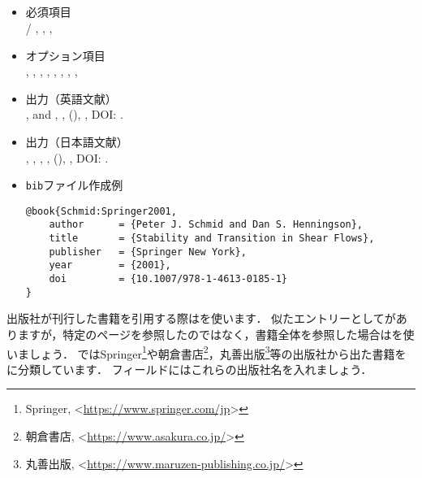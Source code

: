 \documentclass[a4paper,fleqn,uplatex,dvipdfmx]{jsarticle}
\begin{document}
\subsection{\ttbook}
\label{ssec:book}
\begin{tcolorbox}[enhanced, title=\ttbook, drop fuzzy shadow]
    \begin{itemize}
        \item 必須項目 \\
        \ttauthor / \tteditor, \tttitle, \ttpublisher, \ttyear
        \item オプション項目 \\
        \ttvolume, \ttnumber, \ttseries, \ttaddress, \ttedition, \ttmonth, \ttnote, \ttkey, \ttdoi
        \item 出力（英語文献） \\
            \colorbox[gray]{0.8}{\ttauthorf}, \colorbox[gray]{0.8}{\ttauthors} and \colorbox[gray]{0.8}{\ttauthort}, \colorbox[gray]{0.8}{\tttitle}, \colorbox[gray]{0.8}{\ttpublisher} (\colorbox[gray]{0.8}{\ttyear}), \colorbox[gray]{0.8}{\ttnote}, DOI: \colorbox[gray]{0.8}{\ttdoi}.
        \item 出力（日本語文献） \\
            \colorbox[gray]{0.8}{\ttauthorf}, \colorbox[gray]{0.8}{\ttauthors}, \colorbox[gray]{0.8}{\ttauthort}, \colorbox[gray]{0.8}{\tttitle}, \colorbox[gray]{0.8}{\ttpublisher} (\colorbox[gray]{0.8}{\ttyear}), \colorbox[gray]{0.8}{\ttnote}, DOI: \colorbox[gray]{0.8}{\ttdoi}.
        \item \verb|bib|ファイル作成例 \vspace{-3mm}
\begin{verbatim}
@book{Schmid:Springer2001,
    author      = {Peter J. Schmid and Dan S. Henningson},
    title       = {Stability and Transition in Shear Flows},
    publisher   = {Springer New York},
    year        = {2001},
    doi         = {10.1007/978-1-4613-0185-1}
}
\end{verbatim}
    \end{itemize}
\end{tcolorbox}

出版社が刊行した書籍を引用する際は\ttbook を使います．
似たエントリーとして\ttinbook がありますが，特定のページを参照したのではなく，書籍全体を参照した場合は\ttbook を使いましょう．
\JSMErepos ではSpringer\footnote{Springer, \textless\url{https://www.springer.com/jp}\textgreater}や朝倉書店\footnote{朝倉書店, \textless\url{https://www.asakura.co.jp/}\textgreater}，丸善出版\footnote{丸善出版, \textless\url{https://www.maruzen-publishing.co.jp/}\textgreater}等の出版社から出た書籍を\ttbook に分類しています．
\ttpublisher フィールドにはこれらの出版社名を入れましょう．
\end{document}
